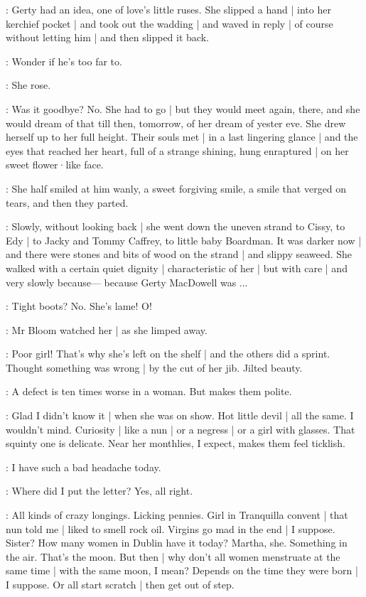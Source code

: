 \gertyNovel:
Gerty had an idea,
one of love's little ruses.
She slipped a hand |
into her kerchief pocket |
and took out the wadding |
and waved in reply |
of course 
without letting him |
and then slipped it back.

\gertySex:
Wonder if he's too far to.

\gertyNovel:
She rose.

\gertyRomantic:
Was it goodbye?%
No.
She had to go |
but they would meet again,
there,
and she would dream of that till then,
tomorrow,
of her dream of yester eve.
She drew herself up to her full height.
Their souls met |
in a last lingering glance |
and the eyes that reached her heart,
full of a strange shining,
hung enraptured |
on her sweet flower·like face.

\gertyNovel:
She half smiled at him wanly,
a sweet forgiving smile,
a smile that verged on tears,
and then they parted.

:
Slowly,
without looking back |
she went down the uneven strand to Cissy,
to Edy |
to Jacky and Tommy Caffrey,
to little baby Boardman.
It was darker now |
and there were stones and bits of wood on the strand |
and slippy seaweed.
She walked with a certain quiet dignity |
characteristic of her |
but with care |%
and very slowly because—%
because Gerty MacDowell was ...

\BloomInt:
Tight boots?
No.
She's lame!
O!

:
Mr Bloom watched her |
as she limped away.

\BloomCurrent:
Poor girl!
That's why
she's left on the shelf |
and the others did a sprint.
Thought something was wrong |
by the cut of her jib.
Jilted beauty.

\BloomAbstract:
A defect is ten times worse in a woman.
But makes them polite.

\BloomCurrent:
Glad I didn't know it |
when she was on show.
Hot little devil |
all the same.
I wouldn't mind.
Curiosity |
like a nun |
or a negress |
or a girl with glasses.
That squinty one is delicate.
Near her monthlies,
I expect,
makes them feel ticklish.

\BloomOther:
I have such a bad headache today.

\BloomToday:
Where did I put the letter?
Yes,
all right.

\BloomAbstract:
All kinds of crazy longings.
Licking pennies.%
Girl in Tranquilla convent |
that nun told me |
liked to smell rock oil.
Virgins go mad in the end |
I suppose.
Sister?
How many women in Dublin have it today?
Martha,
she.
Something in the air.
That's the moon.
But then |
why don't all women menstruate
at the same time |
with the same moon,
I mean?
Depends on the time they were born |
I suppose.
Or all start scratch |
then get out of step.

